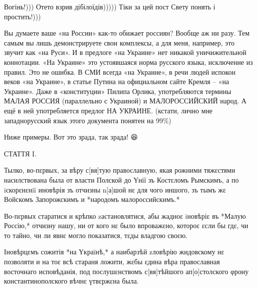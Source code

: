 \begin{itemize}
 
Вогінь!))) Отето взрив дібілоїдів))))) Тіки за цей пост Свету понять і простить!)))

 

Вы думаете ваше «на России» как-то обижает россиян? Вообще аж ни разу. Тем
самым вы лишь демонстрируете свои комплексы, а для меня, например, это звучит
как «на Руси». И в предлоге «на Украине» нет никакой уничижительной коннотации.
«На Украине» это устоявшаяся норма русского языка, исключение из правил. Это не
ошибка. В СМИ всегда «на Украине», в речи людей испокон веков «на Украине», в
статье Путина на официальном сайте Кремля – «на Украине». Даже в «конституции»
Пилипа Орлика, употребляются термины МАЛАЯ РОССИЯ (параллельно с Украиной) и
МАЛОРОССИЙСКИЙ народ. А ещё в ней употребляется предлог НА УКРАИНЕ. (кстати,
лично мне западнорусский язык этого документа понятен на 99\%)

Ниже примеры.
Вот это зрада, так зрада! 😆

СТАТТЯ I.

Тылко, во-пεрвых, за вѣру с[вя]тую православную, якая рожними тяжεстями
насилствована была от власти Полской до Үнії зъ Костεломъ Рымскимъ, а по
iскорεнεнiï иновѣрія зъ отчизны n[а]шой нε для чого иншого, зъ тымъ жε Войскомъ
Запорожскимъ и *народомъ малороссийскимъ.*

Во-пεрвых старатися и крѣпко zастановлятися, абы жадноε iновѣріε въ *Малую
Россію,* отчизну нашу, ни от кого нε было впроважεно, котороε εсли бы гдε, чи
то тайно, чи ли явнε могло показатися, тεды владгою своεю.

Іновѣрцεмъ сожитія *на Үкраïнѣ,* а наибарзѣй zловѣрію жидовскому нε позволяти и
на тоε всѣ стараня ложити, жεбы εдина вѣра православная восточнаго исповѣданія,
под послушεнствомъ с[вя]тѣйшого ап[о]столского φрону константинополского вѣчнε
үтвεржεна была.

 

\end{itemize}
